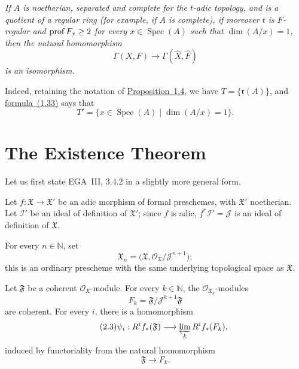 \medskip
{\itshape If $A$ is noetherian, separated and complete for the $t$-adic
topology, and is a quotient of a regular ring (for example, if $A$ is
complete), if moreover $t$ is $F$-regular and $\operatorname{prof} F_x\ge2$ for every
$x\in\operatorname{Spec}(A)$ such that $\dim(A/x)=1$, then the natural
homomorphism
\[
  \Gamma(X,F)\longrightarrow\Gamma(\widehat X,\widehat F)
\]
is an isomorphism.}

\medskip
Indeed, retaining the notation of \hyperref[IX.1.4]{Proposition~1.4}, we have
$T=\{\mathfrak r(A)\}$, and \hyperref[eq:IX.1.33]{formula~(1.33)} says that
\[
  T'=\{x\in\operatorname{Spec}(A)\mid\dim(A/x)=1\}.
\]

\medskip
{}

\setcounter{section}{1}
\section{The Existence Theorem}\label{IX.2}

Let us first state EGA~III, 3.4.2 in a slightly more general form.

Let $f:\mathfrak X\to\mathfrak X'$ be an adic
morphism of formal preschemes, with $\mathfrak X'$ noetherian.
Let $\mathcal I'$ be an ideal of definition of $\mathfrak X'$; since $f$ is
adic,
$f^*\mathcal I'=\mathcal J$ is an ideal of definition of
$\mathfrak X$.

For every $n\in\mathbb N$, set
\begin{equation}\label{eq:IX.2.1}
  \mathfrak X_n=
  \bigl(\mathfrak X,\mathcal O_{\mathfrak X}/\mathcal J^{n+1}\bigr);
\end{equation}
this is an ordinary prescheme with the same underlying topological space as
$\mathfrak X$.

Let $\mathfrak F$ be a coherent $\mathcal O_{\mathfrak X}$-module. For every
$k\in\mathbb N$, the $\mathcal O_{\mathfrak X_k}$-modules
\begin{equation}
\tag{2.2}\label{eq:IX.2.2}
F_k=\mathfrak F/\mathcal J^{k+1}\mathfrak F
\end{equation}
are coherent. For every $i$, there is a homomorphism
\begin{equation}
\tag{2.3}\label{eq:IX.2.3}
\psi_i:R^i f_*(\mathfrak F)
  \longrightarrow\varprojlim_k R^i f_*(F_k),
\end{equation}
induced by functoriality from the natural homomorphism
\begin{equation}
\tag{2.4}\label{eq:IX.2.4}
\mathfrak F\longrightarrow F_k.
\end{equation}

